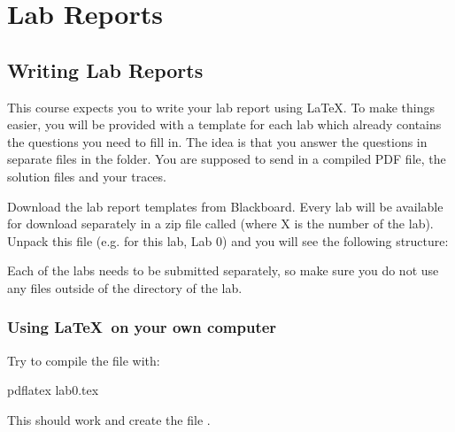 \section{Lab Reports}

\subsection*{Writing Lab Reports}
This course expects you to write your lab report using \LaTeX. To make things easier, you will be provided with a template for each lab which already contains the questions you need to fill in. The idea is that you answer the questions in separate files in the  folder. You are supposed to send in a compiled PDF file, the  solution files and your traces.

Download the lab report templates from Blackboard. Every lab will be available for download separately in a zip file called  (where X is the number of the lab). Unpack this file (e.g. for this lab, Lab 0) and you will see the following structure:

Each of the labs needs to be submitted separately, so make sure you do not use any files outside of the directory of the lab.

\subsubsection{Using \LaTeX~on your own computer}
Try to compile the  file with:
\begin{cmdblock}[gobble=1]
	pdflatex lab0.tex
\end{cmdblock}
This should work and create the file .

